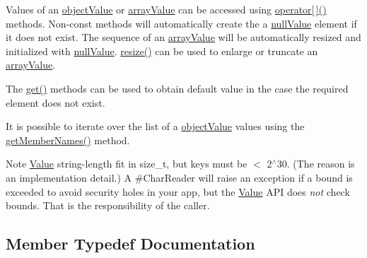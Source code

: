 Values of an \hyperlink{namespaceJson_a7d654b75c16a57007925868e38212b4e_a7d654b75c16a57007925868e38212b4eae8386dcfc36d1ae897745f7b4f77a1f6}{object\+Value} or \hyperlink{namespaceJson_a7d654b75c16a57007925868e38212b4e_a7d654b75c16a57007925868e38212b4eadc8f264f36b55b063c78126b335415f4}{array\+Value} can be accessed using \hyperlink{classJson_1_1Value_a7d99f5dba388cdaa152ce6ef933d64ef_a7d99f5dba388cdaa152ce6ef933d64ef}{operator\mbox{[}$\,$\mbox{]}()} methods. Non-\/const methods will automatically create the a \hyperlink{namespaceJson_a7d654b75c16a57007925868e38212b4e_a7d654b75c16a57007925868e38212b4ea7d9899633b4409bd3fc107e6737f8391}{null\+Value} element if it does not exist. The sequence of an \hyperlink{namespaceJson_a7d654b75c16a57007925868e38212b4e_a7d654b75c16a57007925868e38212b4eadc8f264f36b55b063c78126b335415f4}{array\+Value} will be automatically resized and initialized with \hyperlink{namespaceJson_a7d654b75c16a57007925868e38212b4e_a7d654b75c16a57007925868e38212b4ea7d9899633b4409bd3fc107e6737f8391}{null\+Value}. \hyperlink{classJson_1_1Value_aa284353271ada427dbfa04a42f2be407_aa284353271ada427dbfa04a42f2be407}{resize()} can be used to enlarge or truncate an \hyperlink{namespaceJson_a7d654b75c16a57007925868e38212b4e_a7d654b75c16a57007925868e38212b4eadc8f264f36b55b063c78126b335415f4}{array\+Value}.

The \hyperlink{classJson_1_1Value_a034eb7bf85a44fa759bdaa232788ca66_a034eb7bf85a44fa759bdaa232788ca66}{get()} methods can be used to obtain default value in the case the required element does not exist.

It is possible to iterate over the list of a \hyperlink{namespaceJson_a7d654b75c16a57007925868e38212b4e_a7d654b75c16a57007925868e38212b4eae8386dcfc36d1ae897745f7b4f77a1f6}{object\+Value} values using the \hyperlink{classJson_1_1Value_a79d7725dce6260317333e69022367ac9_a79d7725dce6260317333e69022367ac9}{get\+Member\+Names()} method.

\begin{DoxyNote}{Note}
\hyperlink{classJson_1_1Value_ada6ba1369448fb0240bccc36efaa46f7_ada6ba1369448fb0240bccc36efaa46f7}{Value} string-\/length fit in size\+\_\+t, but keys must be $<$ 2$^\wedge$30. (The reason is an implementation detail.) A \#\+Char\+Reader will raise an exception if a bound is exceeded to avoid security holes in your app, but the \hyperlink{classJson_1_1Value}{Value} A\+PI does {\itshape not} check bounds. That is the responsibility of the caller. 
\end{DoxyNote}


\subsection{Member Typedef Documentation}
\mbox{\label{classJson_1_1Value_a184a91566cccca7b819240f0d5561c7d_a184a91566cccca7b819240f0d5561c7d}} 
